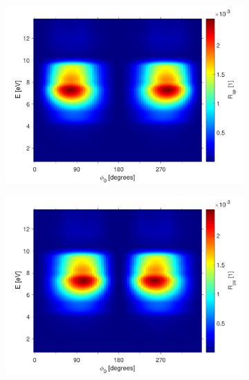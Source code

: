 \begin{figure} %
    \begin{subfigure}{0.49\textwidth}
        \centering
        \includegraphics[width=\linewidth]{figures/ch4/gasb/contour/GaSbcones_Rsp.pdf}
    \end{subfigure}
    \begin{subfigure}{0.49\textwidth}
        \centering
        \includegraphics[width=\linewidth]{figures/ch4/gasb/contour/GaSbcones_Rps.pdf}
    \end{subfigure}
    

\end{figure}
